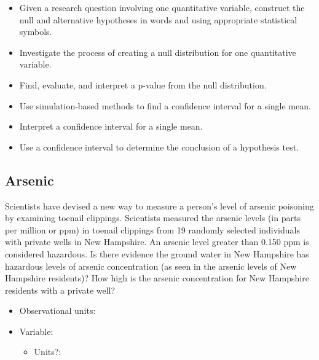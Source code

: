 \documentclass[
]{report}
\providecommand{\tightlist}{%
  \setlength{\itemsep}{0pt}\setlength{\parskip}{0pt}}
\begin{document}
\begin{itemize}
\item
  Given a research question involving one quantitative variable, construct the null and alternative hypotheses
  in words and using appropriate statistical symbols.
\item
  Investigate the process of creating a null distribution for one quantitative variable.
\item
  Find, evaluate, and interpret a p-value from the null distribution.
\item
  Use simulation-based methods to find a confidence interval for a single mean.
\item
  Interpret a confidence interval for a single mean.
\item
  Use a confidence interval to determine the conclusion of a hypothesis test.
\end{itemize}

\subsection{Arsenic}\label{arsenic}

Scientists have devised a new way to measure a person's level of arsenic poisoning by examining toenail clippings. Scientists measured the arsenic levels (in parts per million or ppm) in toenail clippings from 19 randomly selected individuals with private wells in New Hampshire. An arsenic level greater than 0.150 ppm is considered hazardous. Is there evidence the ground water in New Hampshire has hazardous levels of arsenic concentration (as seen in the arsenic levels of New Hampshire residents)? How high is the arsenic concentration for New Hampshire residents with a private well?

\vspace{2mm}

\begin{itemize}
\tightlist
\item
  Observational units:
\end{itemize}

\vspace{2mm}

\begin{itemize}
\item
  Variable:

  \begin{itemize}
  \tightlist
  \item
    Units?:
  \end{itemize}
\end{itemize}
\end{document}
